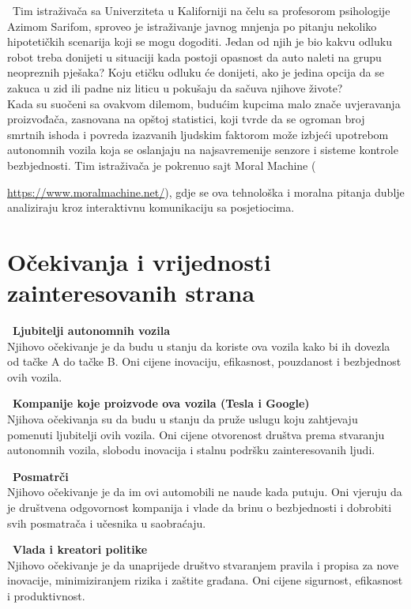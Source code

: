 \documentclass[a4paper]{article}
\begin{document}
\indent~Tim istraživača sa Univerziteta u Kaliforniji na čelu sa profesorom psihologije Azimom Sarifom, sproveo je istraživanje javnog mnjenja po pitanju nekoliko hipotetičkih scenarija koji se mogu dogoditi. Jedan od njih je bio kakvu odluku robot treba donijeti u situaciji kada postoji opasnost da auto naleti na grupu neopreznih pješaka?  Koju etičku odluku će donijeti, ako je jedina opcija da se zakuca u zid ili padne niz liticu u pokušaju da sačuva njihove živote?\\  Kada su suočeni sa ovakvom dilemom, budućim kupcima malo znače uvjeravanja proizvođača, zasnovana na opštoj statistici, koji tvrde da se ogroman broj smrtnih ishoda i povreda izazvanih ljudskim faktorom može izbjeći upotrebom autonomnih vozila koja se oslanjaju na najsavremenije senzore i sisteme kontrole bezbjednosti. Tim istraživača je pokrenuo  sajt  Moral Machine ({\href{https://www.moralmachine.net/}{https://www.moralmachine.net/}), gdje se ova tehnološka i moralna pitanja dublje analiziraju kroz interaktivnu komunikaciju sa posjetiocima.

\section{Očekivanja i vrijednosti zainteresovanih strana}
\label{sec:očekivanja i vrijednosti zainteresovanih strana}
\begin{description}
\item~{\textbf{Ljubitelji autonomnih vozila}}\\Njihovo očekivanje je da budu u stanju da koriste ova vozila kako bi ih dovezla od tačke A do tačke B. Oni cijene inovaciju, efikasnost, pouzdanost i bezbjednost ovih vozila.
\item~{\textbf{Kompanije koje proizvode ova vozila (Tesla i Google)}}\\Njihova očekivanja su da budu u stanju da pruže uslugu koju zahtjevaju pomenuti ljubitelji ovih vozila. Oni cijene otvorenost društva prema stvaranju autonomnih vozila, slobodu inovacija i stalnu
podršku zainteresovanih ljudi.
\item~{\textbf{Posmatrči}}\\Njihovo očekivanje je da im ovi automobili ne naude kada putuju. Oni vjeruju da je društvena
odgovornost kompanija i vlade da brinu o bezbjednosti i dobrobiti svih posmatrača i učesnika u saobraćaju.
\item~{\textbf{Vlada i kreatori politike}}\\Njihovo očekivanje je da unaprijede društvo stvaranjem pravila i propisa za nove inovacije,
minimiziranjem rizika i zaštite građana. Oni cijene sigurnost, efikasnost i produktivnost.
\end{description}

}
\end{document}
